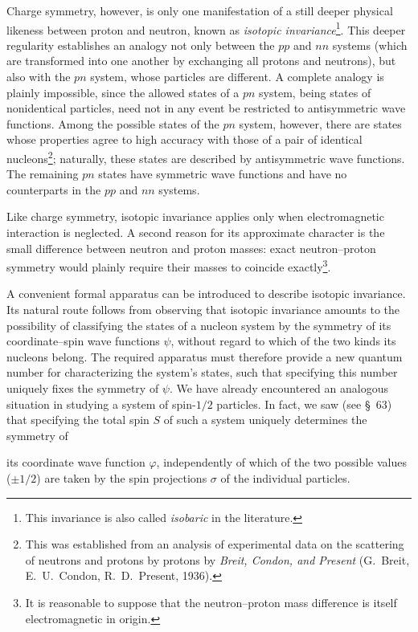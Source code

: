 Charge symmetry, however, is only one manifestation of a still deeper physical
likeness between proton and neutron, known as \emph{isotopic
invariance}\footnote{This invariance is also called \emph{isobaric} in the
literature.}. This deeper regularity establishes an analogy not only between
the $pp$ and $nn$ systems (which are transformed into one another by exchanging
all protons and neutrons), but also with the $pn$ system, whose particles are
different. A complete analogy is plainly impossible, since the allowed states
of a $pn$ system, being states of nonidentical particles, need not in any event
be restricted to antisymmetric wave functions. Among the possible states of
the $pn$ system, however, there are states whose properties agree to high
accuracy with those of a pair of identical nucleons\footnote{This was
established from an analysis of experimental data on the scattering of
neutrons and protons by protons by \emph{Breit, Condon, and Present}
(G.~Breit, E.~U.~Condon, R.~D.~Present, 1936).}; naturally, these states are
described by antisymmetric wave functions. The remaining $pn$ states have
symmetric wave functions and have no counterparts in the $pp$ and $nn$
systems.

Like charge symmetry, isotopic invariance applies only when electromagnetic
interaction is neglected. A second reason for its approximate character is
the small difference between neutron and proton masses: exact neutron--proton
symmetry would plainly require their masses to coincide exactly\footnote{It is
reasonable to suppose that the neutron--proton mass difference is itself
electromagnetic in origin.}.

A convenient formal apparatus can be introduced to describe isotopic
invariance. Its natural route follows from observing that isotopic invariance
amounts to the possibility of classifying the states of a nucleon system by
the symmetry of its coordinate--spin wave functions $\psi$, without regard to
which of the two kinds its nucleons belong. The required apparatus must
therefore provide a new quantum number for characterizing the system's states,
such that specifying this number uniquely fixes the symmetry of $\psi$. We
have already encountered an analogous situation in studying a system of
spin-$1/2$ particles. In fact, we saw (see \S~63) that specifying the total spin
$S$ of such a system uniquely determines the symmetry of

its coordinate wave function $\varphi$, independently of which of the two
possible values ($\pm1/2$) are taken by the spin projections $\sigma$ of the
individual particles.

